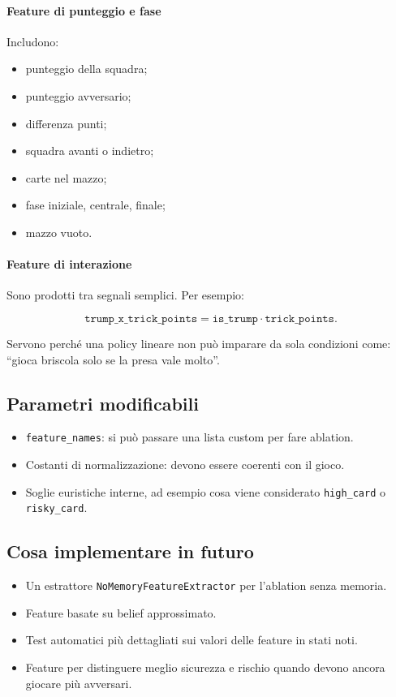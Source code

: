 \documentclass[11pt,a4paper]{article}
\begin{document}
\paragraph{Feature di punteggio e fase}

Includono:

\begin{itemize}
  \item punteggio della squadra;
  \item punteggio avversario;
  \item differenza punti;
  \item squadra avanti o indietro;
  \item carte nel mazzo;
  \item fase iniziale, centrale, finale;
  \item mazzo vuoto.
\end{itemize}

\paragraph{Feature di interazione}

Sono prodotti tra segnali semplici. Per esempio:

\[
\texttt{trump\_x\_trick\_points}
=
\texttt{is\_trump}\cdot \texttt{trick\_points}.
\]

Servono perché una policy lineare non può imparare da sola condizioni come:
``gioca briscola solo se la presa vale molto''.

\subsection{Parametri modificabili}

\begin{itemize}
  \item \texttt{feature\_names}: si può passare una lista custom per fare
  ablation.
  \item Costanti di normalizzazione: devono essere coerenti con il gioco.
  \item Soglie euristiche interne, ad esempio cosa viene considerato
  \texttt{high\_card} o \texttt{risky\_card}.
\end{itemize}

\subsection{Cosa implementare in futuro}

\begin{itemize}
  \item Un estrattore \texttt{NoMemoryFeatureExtractor} per l'ablation senza
  memoria.
  \item Feature basate su belief approssimato.
  \item Test automatici più dettagliati sui valori delle feature in stati noti.
  \item Feature per distinguere meglio sicurezza e rischio quando devono ancora
  giocare più avversari.
\end{itemize}
\end{document}
